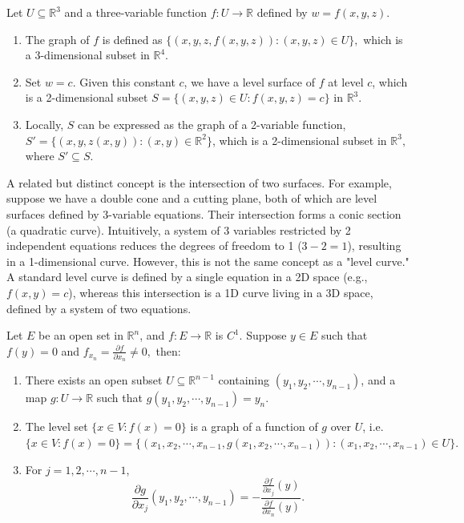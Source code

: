 \begin{remark}
    Let $U\subseteq\mathbb{R}^3$ and a three-variable function $f:U\to\mathbb{R}$ defined by $w=f(x,y,z)$.
    \begin{enumerate}
        \item The graph of $f$ is defined as $\{(x,y,z,f(x,y,z)):(x,y,z)\in U\},$ which is a 3-dimensional subset in $\mathbb{R}^4.$
        \item Set $w=c$. Given this constant $c$, we have a level surface of $f$ at level $c$, which is a 2-dimensional subset $S=\{(x,y,z)\in U: f(x,y,z)=c\}$ in $\mathbb{R}^3.$ 
        \item Locally, $S$ can be expressed as the graph of a 2-variable function, $S'=\{(x,y,z(x,y)):(x,y)\in\mathbb{R}^2\}$, which is a 2-dimensional subset in $\mathbb{R}^3,$ where $S'\subseteq S.$ 
    \end{enumerate}
\end{remark}

\begin{remark}
    A related but distinct concept is the intersection of two surfaces. For example, suppose we have a double cone and a cutting plane, both of which are level surfaces defined by 3-variable equations. 
    Their intersection forms a conic section (a quadratic curve). Intuitively, a system of 3 variables restricted by 2 independent equations reduces the degrees of freedom to 1 ($3 - 2 = 1$), resulting in a 1-dimensional curve. 
    However, this is not the same concept as a "level curve." A standard level curve is defined by a single equation in a 2D space (e.g., $f(x,y)=c$), whereas this intersection is a 1D curve living in a 3D space, defined by a system of two equations.
\end{remark}


\begin{theorem}
Let $E$ be an open set in $\mathbb{R}^n$, and $f:E\to\mathbb{R}$ is $C^1$. Suppose $y\in E$ such that $f(y)=0$ and $f_{x_n}=\frac{\partial f}{\partial x_n}\neq 0,$ then:
\begin{enumerate}
    \item There exists an open subset $U\subseteq\mathbb{R}^{n-1}$ containing $(y_1,y_2,\cdots,y_{n-1})$, and a map $g:U\to\mathbb{R}$ such that $g(y_1,y_2,\cdots,y_{n-1})=y_n.$
    \item The level set $\{x\in V: f(x)=0\}$ is a graph of a function of $g$ over $U$, i.e. $\{x\in V: f(x)=0\}=\{(x_1,x_2,\cdots,x_{n-1},g(x_1,x_2,\cdots,x_{n-1})):(x_1,x_2,\cdots,x_{n-1})\in U\}.$
    \item For $j=1,2,\cdots,n-1$,
    $$\frac{\partial g}{\partial x_j}(y_1, y_2,\cdots,y_{n-1})=-\frac{\frac{\partial f}{\partial x_j}(y)}{\frac{\partial f}{\partial x_n}(y)}.$$ 
\end{enumerate}

\end{theorem}


